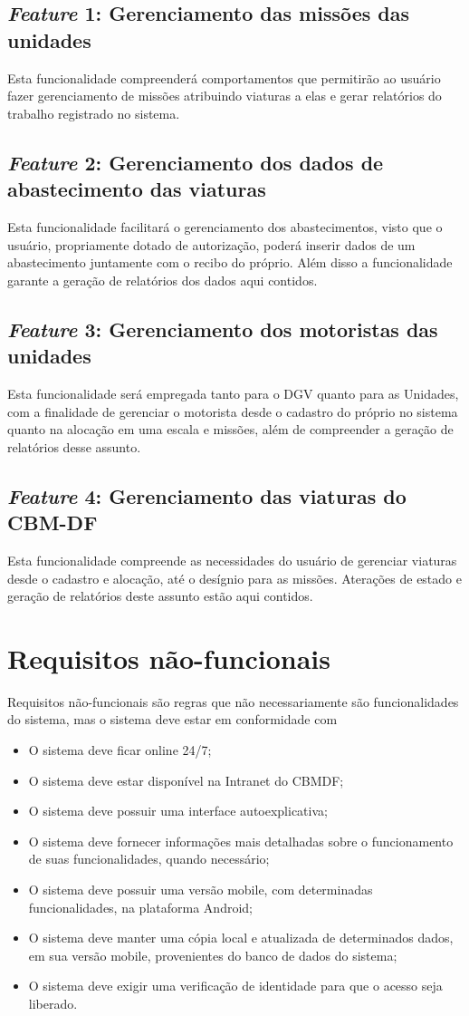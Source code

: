 		\subsection{\textit{Feature} 1: Gerenciamento das missões das unidades}
Esta funcionalidade compreenderá comportamentos que permitirão ao usuário fazer gerenciamento de missões atribuindo viaturas a elas e gerar relatórios do trabalho registrado no sistema.
		\subsection{\textit{Feature} 2: Gerenciamento dos dados de abastecimento das viaturas}
Esta funcionalidade facilitará o gerenciamento dos abastecimentos, visto que o usuário, propriamente dotado de autorização, poderá inserir dados de um abastecimento juntamente com o recibo do próprio. Além disso a funcionalidade garante a geração de relatórios dos dados aqui contidos.
		\subsection{\textit{Feature} 3: Gerenciamento dos motoristas das unidades}
Esta funcionalidade será empregada tanto para o DGV quanto para as Unidades, com a finalidade de gerenciar o motorista desde o cadastro do próprio no sistema quanto na alocação em uma escala e missões, além de compreender a geração de relatórios desse assunto.
		\subsection{\textit{Feature} 4: Gerenciamento das viaturas do CBM-DF}
Esta funcionalidade compreende as necessidades do usuário de gerenciar viaturas desde o cadastro e alocação, até o desígnio para as missões. Aterações de estado e geração de relatórios deste assunto estão aqui contidos.
	\section{Requisitos não-funcionais}		
Requisitos não-funcionais são regras que não necessariamente são funcionalidades do sistema, mas o sistema deve estar em conformidade com 
\begin{itemize}
 \item O sistema deve ficar online 24/7;
 \item O sistema deve estar disponível na Intranet do CBMDF;
 \item O sistema deve possuir uma interface autoexplicativa;
 \item O sistema deve fornecer informações mais detalhadas sobre o funcionamento de suas funcionalidades, quando necessário;
 \item O sistema deve possuir uma versão mobile, com determinadas funcionalidades, na plataforma Android;
 \item O sistema deve manter uma cópia local e atualizada de determinados dados, em sua versão mobile, provenientes do banco de dados do sistema;
 \item O sistema deve exigir uma verificação de identidade para que o acesso seja liberado.
\end{itemize}
